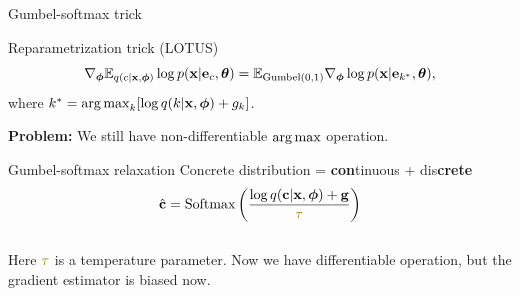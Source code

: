 \begin{frame}{Gumbel-softmax trick}
	\begin{block}{Reparametrization trick (LOTUS)}
		\vspace{-0.7cm}
		\[
			\nabla_{\boldsymbol{\phi}} \mathbb{E}_{q(c | \mathbf{x}, \boldsymbol{\phi})} \log p(\mathbf{x} | \mathbf{e}_{c} , \boldsymbol{\theta}) = \mathbb{E}_{\text{Gumbel}(0, 1)} \nabla_{\boldsymbol{\phi}} \log p(\mathbf{x} | \mathbf{e}_{k^*} , \boldsymbol{\theta}),
		\]
		where $k^* = \operatorname*{arg\,max}_k [\log q(k | \mathbf{x}, \boldsymbol{\phi}) + g_k]$.
	\end{block}
	\textbf{Problem:} We still have non-differentiable $\operatorname*{arg\,max}$ operation.
	
	\begin{block}{Gumbel-softmax relaxation}
		{\color{violet}Con}{\color{teal}crete} distribution = {\color{violet}\textbf{con}tinuous} + {\color{teal}dis\textbf{crete}}
		\[
			\hat{\bc} = \text{Softmax}\left(\frac{\log q(\bc | \bx, \bphi) + \bg}{\color{olive}\tau}\right)
		\]
		\vspace{-0.4cm} \\
		Here ${\color{olive}\tau}$ is a temperature parameter. Now we have differentiable operation, but the gradient estimator is biased now.
 	\end{block}
\end{frame}
